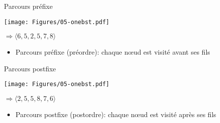 \begin{frame}{Parcours préfixe}

\begin{center}
\texttt{[image: Figures/05-onebst.pdf]}
\bigskip

$\Rightarrow \langle 6, 5, 2, 5, 7, 8\rangle$
\end{center}

\begin{itemize}
\item Parcours préfixe (préordre): chaque n\oe ud est visité \alert{avant} ses fils

\bigskip
\begin{center}
\begin{small}
\end{small}
\end{center}

\end{itemize}

\end{frame}

\begin{frame}{Parcours postfixe}

\begin{center}
\texttt{[image: Figures/05-onebst.pdf]}
\bigskip

$\Rightarrow \langle 2, 5, 5, 8, 7, 6\rangle$
\end{center}

\begin{itemize}
\item Parcours postfixe (postordre): chaque n\oe ud est visité \alert{après} ses fils

\bigskip
\begin{center}
\begin{small}
\end{small}
\end{center}

\end{itemize}

\end{frame}

